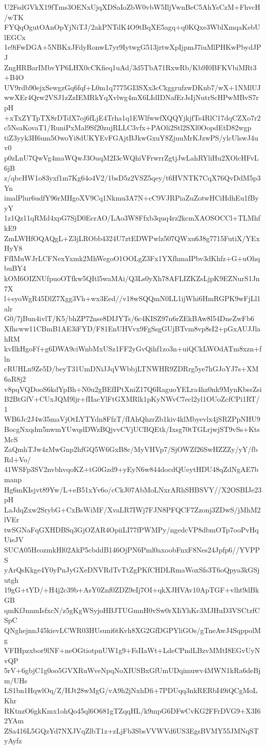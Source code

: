 U2FsdGVkX19fTms3OENxUjqXDSaIoZbW0vbW5IljVwnBeC5AhYsCzM+FhvcH/wTK
FYQqOgutOAnOpYjNiTJ/2akPNTdK4O9tBqXE5agq+q0KQxe3WblXmqaKebUlEGCx
1e9iFwDGA+5NBKxJFdyRonwL7yr9IytwgG513jrtwXpIjpmJ7iuMlPHKwPbydJPJ
ZngHRBarIMbvYP6LHX0cCKfieq1uAd/3d5TbA71RxwRb/Kb9I0BFKVbiMRt3+B4O
UV9rdb90ejxSewgzGq6fqf+L0m1q7775GI3SXx3cCkggrufzwDKnb7/wX+1NMlUJ
wwXEr4Qrw2VSJ1zZzIEMRkYqXvlwg4mX6LIdIDNafErJsIjNutrScHPwMBvS7rpH
+xTxZYTpTX8rDTdX7oj6fLjE4Trha1q1EWlfwwfXQQYjkjfTs4RlC17dqCZXo7r2
c5NsaKovaT1/RuniPxMal9Sf20zujRLLC3vfx+PAOli2Stl2SXl0OopdEtD82wgp
tiZ3yyk3H6um5OwoYi8dUKYEvFGAjtBJkwGxuY8ZjuuMrKJzwPS/ylcUlswJ4uv0
p0zLnU7QwVg4maWQwJ3OuqM2I3cWQhiVFrwrrZgtjJwLahRYliHu2XOlcHFvL6jB
z/qbcHW1o83yxf1m7Kg64o4V2/1bsD5z2VSZ5qey/t6HVNTK7CqX76QvDdM5p3Yn
imalPlur6udfY96rMHgoXV9Cq1Nkmu3A7N+cC9VJRPiaZuZotwHCiHdhEu1fByyY
1z1Qz11qRMd4xpG7SjD0EcrAO/LAo3W8Ffxb3quq4rz2kcmXAOSOCCl+TLMhfkE9
ZmLWHfOQAQgL+Z3jLRObb4324U7ztEDWPwlz507QWxu6J8g7715FutiX/YExHyY8
FfIMuWJrLCFNexYxmk2MhWegoO1OOLgZ3Fx1YXfhmaIPbv3dKhfz+G+uOhqbuBY4
kOM6OIZNUfpuoOTfkw5QItl5waMAi/Q3Ls0yXh78AFLIZKZsLjpK9EZNurS1Jn7X
l+syoWgR45DlZ7Xgg3Vh+wx3Eed//v18wSQQmN0LL1ijWhi6HmRGPK9wFjLl1alr
G0/7jBun4ivlT/K5/bhZP72nse8DIJYTs/6c4KISZ97n6rZEkBAw8l54DneZwFb6
Xfhcww11CBmB1AE3iFYD/F81EnUHVvx9FgSsgGUjBTvm8vp8sI2+pGxAUJJlahRM
kvIlkHgoFf+g6DWA9ciWnbMxUSz1FF2yGvQihf1zo3n+uiQCkLWOdATm8xzn+fln
cRUHLn9Ze5D/beyT31UmDNiJJqVWbbjLTNWHR9ZDRrg5ye7hGJoYJ7s+XM6aR8j2
v8pqVQDooS6kdYpBh+N0u2gBEfIPtXniZ17Q6RaguoYELra4hz0nk9MynKbssZsi
B2BtGfV+CUxJQM9ljr+fIIacYlFtGXMRlk1pKyNWvC7ecl2yl1OUoZcfCPi1RT/1
WB6Jc2J4w35maVjOtLYTYdn8FfzT/fIAhQhzrZb1kiv4klMbyevlx4jSRZPpNHU9
BocgNxqdm5nwmYUwqdDWzBQjvvCVjUCBQEtk/Ixsg70tTGLrjwjST9vSs+KtsMcS
ZaQmhTJw4zMwGnp2hfGQ5W6GxB8c/MyVHVp7/SjOWZf26SwHZZZy/yY/fbRd+Vo/
41WSFp3SV2nvbhvqoKZ+tG0Gzd9+yEyN6w844docdQUeytHDU48qZdNgAE7bmanp
Hg6mKIsjvt89Yw/L+eB51xYv6o/cCkJ07AbMoLNxrARhSHBSVY//X2OSBIJe23pH
LaJdqZxw2SrybG+CxBsWiMF/XvaLR7IWj7FJN8PFQCF7Zzonj3ZDwS/jMhM2lVEr
twSGNaFqGXHDBSq3GjOZAR4OpiiLI77fPWMPy/ngedcVP8dbmOTp7ooPvHqUieJV
SUCA05HcozmkHl02AkP5cbddB146OjPN6Pml0axoobFnxF8Nes24Jpfp6//YVPPS
yArQsKkge4Y0yPnJyGXeDNVRdTvTtZgPKfCHDLRmaWoxSfs3T6oQpya3kGSjutgh
19gG+tYD/+H4j2c39b+AsY0Znf0ZDZ9eIj7OI+qkXJHVAv10ApTGF+vlht9dBkGB
qmKfJnnmIsfxcN/z5gKgWSyjoHBJTUGmnH0vSw0rXIiYhKc3MJHuD3VSCtzfCSpC
QNghejnnJ45kievLCWR03HUsuni6tKvh8XG2GfDGPYliGOs/gTneAwJ4SqppolMg
VFIHpzxbor9lNF+neOGtiotpnUW1g9+FsIIaWt+LdeCPndLBzvMMtI8EGvUyNvQP
5rV+6gbjC1g0oo5GVXRuWveNpqNoXIUSBxGfUmUDqimuwv4MWN1kRa6deBjm/UHs
LS1bn1HqwlOq/Z/HJt28wMgG/vA9h2jNxhDfi+7PDUqq3nkRERbI49iQCgMoLKhr
RKtnzO6gkKmx1ohQo45ql6O681gTZqqHL/k9mpG6DFwCvKG2FFrDVG9+X3I62YAm
ZSa416L5GQzYd7NXJVqZlbT1z+zLjFb3SbsVVWVd6US3EgsBVMY55JMNqSTyAyfz
